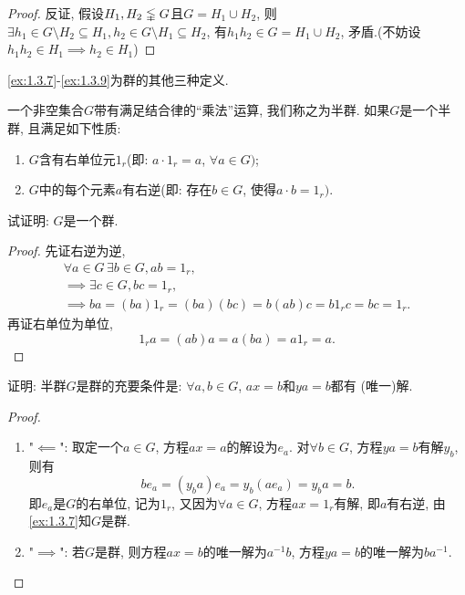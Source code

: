 \begin{proof}
    反证, 假设$H_1, H_2 \lvertneqq G$且$G = H_1 \cup H_2$,
则$\exists h_1 \in G \setminus H_2 \subseteq H_1, h_2 \in G \setminus H_1 \subseteq H_2$,
有$h_1h_2 \in G = H_1 \cup H_2$, 矛盾.(不妨设$h_1h_2 \in H_1 \implies h_2 \in H_1$)
\end{proof}

\ref{ex:1.3.7}-\ref{ex:1.3.9}为群的其他三种定义.

\begin{problem}\label{ex:1.3.7}
    一个非空集合$G$带有满足结合律的“乘法”运算, 我们称之为半群.
如果$G$是一个半群, 且满足如下性质: 
\begin{enumerate}[(1)]
    \item $G$含有右单位元$1_r$(即: $a \cdot 1_r = a$, $\forall a \in G)$;
    \item $G$中的每个元素$a$有右逆(即: 存在$b \in G$, 使得$a \cdot b = 1_r)$.
\end{enumerate}
试证明: $G$是一个群.
\end{problem}

\begin{proof}
    先证右逆为逆, 
\[
\begin{gathered}
    \forall a \in G \, \exists b \in G, ab = 1_r,\\
    \implies \exists c \in G, bc = 1_r,\\
    \implies ba = (ba)1_r = (ba)(bc) = b(ab)c = b1_rc = bc = 1_r.
\end{gathered}
\]
    再证右单位为单位, 
\[
    1_ra = (ab)a = a(ba) = a1_r = a.
\]
\end{proof}

\begin{problem}\label{ex:1.3.8}
    证明: 半群$G$是群的充要条件是: $\forall a, b \in G$, $ax = b$和$ya = b$都有
(唯一)解.
\end{problem}

\begin{proof}
\begin{enumerate}[(1)]
    \item "$\impliedby$": 取定一个$a \in G$, 方程$ax = a$的解设为$e_a$.
对$\forall b \in G$, 方程$ya = b$有解$y_b$, 则有
\[
    be_a = (y_ba)e_a = y_b(ae_a) = y_ba = b.
\]
即$e_a$是$G$的右单位, 记为$1_r$, 又因为$\forall a \in G$,
方程$ax = 1_r$有解, 即$a$有右逆, 由\ref{ex:1.3.7}知$G$是群.
    \item "$\implies$": 若$G$是群, 则方程$ax = b$的唯一解为$a^{-1}b$,
方程$ya = b$的唯一解为$ba^{-1}$.
\end{enumerate}
    
\end{proof}

